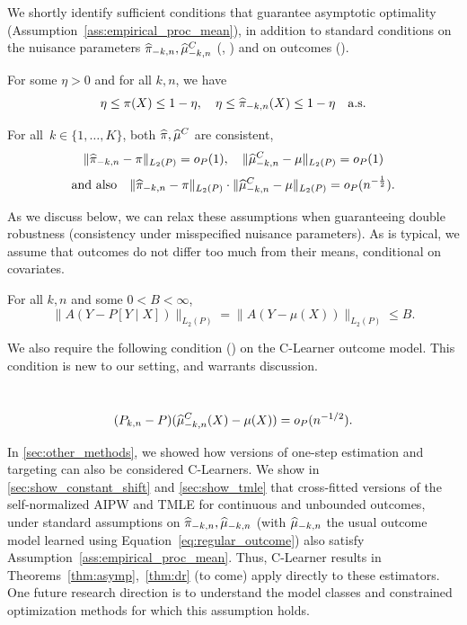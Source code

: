 \ifdefined\response\newpage\newpage\clearpage\pagebreak\else\fi
\label{sec:ass_d_note}
We shortly identify sufficient conditions that guarantee asymptotic optimality  (Assumption~\ref{ass:empirical_proc_mean}), in addition to standard conditions on the nuisance parameters $\widehat{\pi}_{-k,n},\widehat{\mu}^C_{-k,n}$ (, ) and on outcomes (). 
\begin{assumption}[Overlap]
\label{ass:overlap}
    For some $\eta>0$ and for all $k,n$, we have  
    \vspace{-0.2em}
    $$
    \eta\leq  \pi(X) \le 1-\eta, \quad \eta \leq \widehat{\pi}_{-k,n}(X) \leq 1-\eta \quad \text{a.s.}
    $$  
\end{assumption}
\vspace{-1.2em}
\begin{assumption}
\label{ass:consistency}
For all~$k \in \{1,\ldots,K\}$, 
both $\widehat{\pi}, \widehat{\mu}^C$ are consistent,\vspace{-0.3em}
    $$
    \|\widehat{\pi}_{-k,n} - \pi\|_{L_2(P)}=o_P(1), \quad  \|\widehat{\mu}_{-k,n}^C - \mu\|_{L_2(P)}=o_P(1)
    $$ 
$$\text{and also} \quad    \|\widehat{\pi}_{-k,n} - \pi\|_{L_2(P)} \cdot  \|\widehat{\mu}_{-k,n}^C - \mu\|_{L_2(P)}=o_P(n^{-\frac{1}{2}}).$$
\end{assumption}
\noindent As we discuss below, we can relax these assumptions
when guaranteeing double robustness (consistency under misspecified nuisance parameters).
As is typical, we assume that outcomes do not differ too much from their means, conditional on covariates. 
\begin{assumption}
 \label{ass:bounded_outcomes} For all $k,n$ and some $0<B<\infty$, 
\vspace{-0.3em}
$$\|A(Y-P[Y\mid X])\|_{L_2(P)} =\|A(Y-\mu(X))\|_{L_2(P)} \leq B. $$
\end{assumption}

We also require the following condition () on the C-Learner outcome model. This condition is new to our setting, and warrants discussion. %

\begin{assumption}%
\label{ass:empirical_proc_mean}\ \vspace{-0.3em}
$$(P_{k,n}-P)(  \widehat{\mu}_{-k,n}^C(X)- \mu(X)) =o_P(n^{-1/2}).$$
\end{assumption}
\noindent In \cref{sec:other_methods}, we showed how versions of one-step estimation  and targeting can also be considered C-Learners. We show in \cref{sec:show_constant_shift} and \cref{sec:show_tmle} that cross-fitted versions of the self-normalized AIPW and TMLE for continuous and unbounded outcomes, under standard assumptions on $\widehat{\pi}_{-k,n}, \widehat{\mu}_{-k,n}$ (with $\widehat{\mu}_{-k,n}$ the usual outcome model learned using Equation~\eqref{eq:regular_outcome}) also satisfy Assumption~\ref{ass:empirical_proc_mean}. Thus, C-Learner results in Theorems~\ref{thm:asymp},~\ref{thm:dr} (to come) apply directly to these estimators. %
One future research direction is to understand the model classes and constrained optimization methods for which this assumption holds. 

